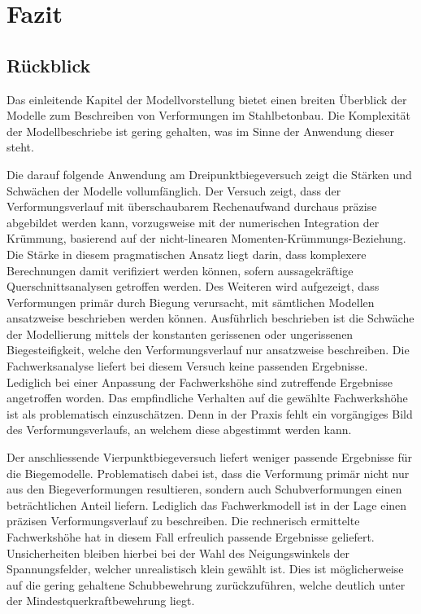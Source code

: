 \documentclass[
  12pt,
  letterpaper,
  egregdoesnotlikesansseriftitles]{scrreprt}
\begin{document}

\hypertarget{fazit}{%
\chapter{Fazit}\label{fazit}}

\hypertarget{ruxfcckblick}{%
\section{Rückblick}\label{ruxfcckblick}}

Das einleitende Kapitel der Modellvorstellung bietet einen breiten
Überblick der Modelle zum Beschreiben von Verformungen im Stahlbetonbau.
Die Komplexität der Modellbeschriebe ist gering gehalten, was im Sinne
der Anwendung dieser steht.

Die darauf folgende Anwendung am Dreipunktbiegeversuch zeigt die Stärken
und Schwächen der Modelle vollumfänglich. Der Versuch zeigt, dass der
Verformungsverlauf mit überschaubarem Rechenaufwand durchaus präzise
abgebildet werden kann, vorzugsweise mit der numerischen Integration der
Krümmung, basierend auf der nicht-linearen Momenten-Krümmungs-Beziehung.
Die Stärke in diesem pragmatischen Ansatz liegt darin, dass komplexere
Berechnungen damit verifiziert werden können, sofern aussagekräftige
Querschnittsanalysen getroffen werden. Des Weiteren wird aufgezeigt,
dass Verformungen primär durch Biegung verursacht, mit sämtlichen
Modellen ansatzweise beschrieben werden können. Ausführlich beschrieben
ist die Schwäche der Modellierung mittels der konstanten gerissenen oder
ungerissenen Biegesteifigkeit, welche den Verformungsverlauf nur
ansatzweise beschreiben. Die Fachwerksanalyse liefert bei diesem Versuch
keine passenden Ergebnisse. Lediglich bei einer Anpassung der
Fachwerkshöhe sind zutreffende Ergebnisse angetroffen worden. Das
empfindliche Verhalten auf die gewählte Fachwerkshöhe ist als
problematisch einzuschätzen. Denn in der Praxis fehlt ein vorgängiges
Bild des Verformungsverlaufs, an welchem diese abgestimmt werden kann.

Der anschliessende Vierpunktbiegeversuch liefert weniger passende
Ergebnisse für die Biegemodelle. Problematisch dabei ist, dass die
Verformung primär nicht nur aus den Biegeverformungen resultieren,
sondern auch Schubverformungen einen beträchtlichen Anteil liefern.
Lediglich das Fachwerkmodell ist in der Lage einen präzisen
Verformungsverlauf zu beschreiben. Die rechnerisch ermittelte
Fachwerkshöhe hat in diesem Fall erfreulich passende Ergebnisse
geliefert. Unsicherheiten bleiben hierbei bei der Wahl des
Neigungswinkels der Spannungsfelder, welcher unrealistisch klein gewählt
ist. Dies ist möglicherweise auf die gering gehaltene Schubbewehrung
zurückzuführen, welche deutlich unter der Mindestquerkraftbewehrung
liegt.
\end{document}
